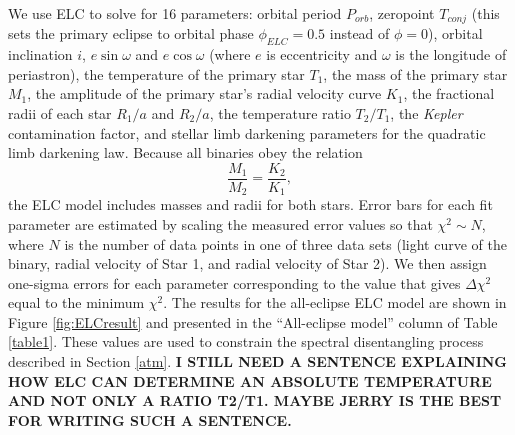 We use ELC to solve for 16 parameters: orbital period $P_{orb}$, zeropoint $T_{conj}$ (this sets the primary eclipse to orbital phase $\phi_{ELC} = 0.5$ instead of $\phi = 0$), orbital inclination $i$, $e \sin \omega$ and $e \cos \omega$ (where $e$ is eccentricity and $\omega$ is the longitude of periastron), the temperature of the primary star $T_1$, the mass of the primary star $M_1$, the amplitude of the primary star's radial velocity curve $K_1$, the fractional radii of each star $R_1/a$ and $R_2/a$, the temperature ratio $T_2/T_1$, the \emph{Kepler} contamination factor, and stellar limb darkening parameters for the quadratic limb darkening law. Because all binaries obey the relation
\begin{equation}
\frac{M_1}{M_2} = \frac{K_2}{K_1},
\end{equation}
the ELC model includes masses and radii for both stars. Error bars for each fit parameter are estimated by scaling the measured error values so that $\chi^2 \sim N$, where $N$ is the number of data points in one of three data sets (light curve of the binary, radial velocity of Star 1, and radial velocity of Star 2). We then assign one-sigma errors for each parameter corresponding to the value that gives $\Delta \chi^2$ equal to the minimum $\chi^2$. The results for the all-eclipse ELC model are shown in Figure \ref{fig:ELCresult} and presented in the ``All-eclipse model'' column of Table \ref{table1}. These values are used to constrain the spectral disentangling process described in Section \ref{atm}.
{\bf{I STILL NEED A SENTENCE EXPLAINING HOW ELC CAN DETERMINE AN ABSOLUTE TEMPERATURE AND NOT ONLY A RATIO T2/T1. MAYBE JERRY IS THE BEST FOR WRITING SUCH A SENTENCE.}}
  